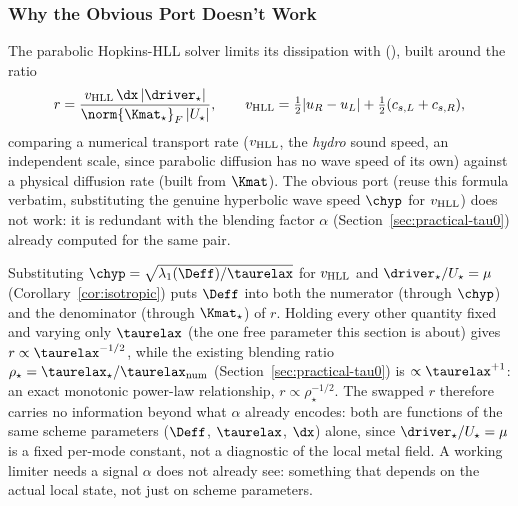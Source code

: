 \subsubsection{Why the Obvious Port Doesn't Work}
\label{sec:limiter-naive-port}
The parabolic Hopkins-HLL solver limits its dissipation with
 (),
built around the ratio
\begin{equation}
  r = \frac{v_{\rm HLL}\,\dx\,\lvert\driver_\star\rvert}{\norm{\Kmat_\star}_F\,\lvert U_\star\rvert} ,
  \qquad v_{\rm HLL} = \tfrac12\lvert u_R-u_L\rvert + \tfrac12(c_{s,L}+c_{s,R}) ,
\end{equation}
comparing a numerical transport rate ($v_{\rm HLL}$, the \emph{hydro}
sound speed, an independent scale, since parabolic diffusion has no
wave speed of its own) against a physical diffusion rate (built from
$\Kmat$). The obvious port (reuse this formula verbatim, substituting
the genuine hyperbolic wave speed $\chyp$ for $v_{\rm HLL}$) does not
work: it is redundant with the blending factor $\alpha$
(Section~\ref{sec:practical-tau0}) already computed for the same pair.

\begin{remark}
\label{rem:limiter-redundant}
Substituting $\chyp=\sqrt{\lambda_1(\Deff)/\taurelax}$ for $v_{\rm HLL}$
and $\driver_\star/U_\star=\mu$ (Corollary~\ref{cor:isotropic}) puts
$\Deff$ into both the numerator (through $\chyp$) and the denominator
(through $\Kmat_\star$) of $r$. Holding every other quantity fixed and
varying only $\taurelax$ (the one free parameter this section is about)
gives $r\propto\taurelax^{-1/2}$, while the existing blending ratio
$\rho_\star=\taurelax_\star/\taurelax_{\rm num}$
(Section~\ref{sec:practical-tau0}) is $\propto\taurelax^{+1}$: an exact
monotonic power-law relationship, $r\propto\rho_\star^{-1/2}$. The swapped $r$ therefore
carries no information beyond what $\alpha$ already encodes: both are
functions of the same scheme parameters ($\Deff$, $\taurelax$, $\dx$)
alone, since $\driver_\star/U_\star=\mu$ is a fixed per-mode constant,
not a diagnostic of the local metal field. A working limiter needs a
signal $\alpha$ does not already see: something that depends on the
actual local state, not just on scheme parameters.
\end{remark}

